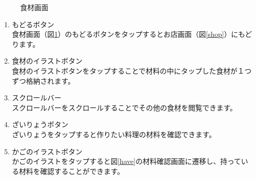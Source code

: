 \documentclass[a4j]{jarticle}
\begin{document}
\begin{figure}[H]
    \begin{center}
    \caption {食材画面}
    \label{shop_material}
    \end{center}
\end{figure}

\begin{enumerate}
  \renewcommand{\labelenumi}{\textcircled{\scriptsize \theenumi}}
\item もどるボタン\\
  食材画面（図\ref{shop_material}）のもどるボタンをタップするとお店画面（図\ref{shop}）にもどります。
\item 食材のイラストボタン\\
  食材のイラストボタンをタップすることで材料の中にタップした食材が１つずつ格納されます。
\item スクロールバー\\
  スクロールバーをスクロールすることでその他の食材を閲覧できます。
\item ざいりょうボタン\\
  ざいりょうをタップすると作りたい料理の材料を確認できます。
\item かごのイラストボタン\\
  かごのイラストをタップすると図\ref{have}の材料確認画面に遷移し、持っている材料を確認することができます。
\end{enumerate}
\end{document}
